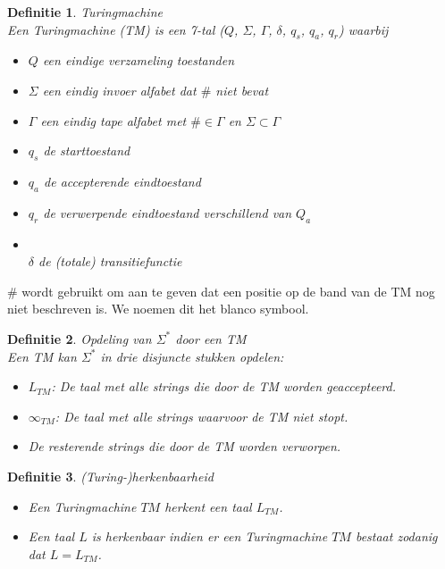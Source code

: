 \documentclass[a4paper]{article}
\newtheorem{tdefinitie}{Definitie}[section]
\newenvironment{definitie}[1]%
  {\begin{mdframed}[backgroundcolor=silver,
    topline=false,
    rightline=false,
    leftline=false,
    bottomline=false]\begin{tdefinitie}#1\\\normalfont}%
  {\end{tdefinitie}\end{mdframed}}
\newcommand{\sstar}{\ensuremath{\Sigma^*}}
\begin{document}
\begin{definitie}{Turingmachine}
  \label{def:tm}
  Een Turingmachine (TM) is een 7-tal ($Q$, $\Sigma$, $\Gamma$, $\delta$, $q_s$, $q_a$, $q_r$) waarbij
  \begin{itemize}
  \item $Q$ een eindige verzameling toestanden
  \item $\Sigma$ een eindig invoer alfabet dat $\#$ niet bevat
  \item $\Gamma$ een eindig tape alfabet met $\# \in \Gamma$ en $\Sigma \subset \Gamma$
  \item $q_s$ de starttoestand
  \item $q_a$ de accepterende eindtoestand
  \item $q_r$ de verwerpende eindtoestand verschillend van $Q_a$
  \item {}\\$\delta$ de (totale) transitiefunctie
  \end{itemize}
\end{definitie}

$\#$ wordt gebruikt om aan te geven dat een positie op de band van de TM nog niet beschreven is. We noemen dit het blanco symbool.


\begin{definitie}{Opdeling van $\sstar$ door een TM}
  Een TM kan $\sstar$ in drie disjuncte stukken opdelen:
  \begin{itemize}
  \item $L_{TM}$: De taal met alle strings die door de TM worden geaccepteerd.
  \item $\infty_{TM}$: De taal met alle strings waarvoor de TM niet stopt.
  \item De resterende strings die door de TM worden verworpen.
  \end{itemize}
\end{definitie}

\begin{definitie}{(Turing-)herkenbaarheid}
  \vspace{-5mm}\begin{itemize}
  \item Een Turingmachine $TM$ herkent een taal $L_{TM}$.
  \item Een taal $L$ is herkenbaar indien er een Turingmachine $TM$ bestaat zodanig dat $L = L_{TM}$.
  \end{itemize}
\end{definitie}
\end{document}
